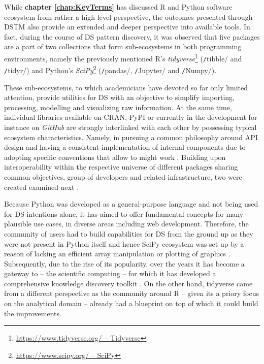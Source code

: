While \textbf{chapter \ref{chap:KeyTerms}} has discussed R and Python software ecosystem from rather a high-level perspective, the outcomes presented through \ac{DSTM} also provide an extended and deeper perspective into available tools.
In fact, during the course of \ac{DS} pattern discovery, it was observed that five packages are a part of two collections that form sub-ecosystems in both programming environments, namely the previously mentioned R's \emph{tidyverse}\footnote{\href{https://www.tidyverse.org}{https://www.tidyverse.org/ -- Tidyverse}} (\texttt/tibble/ and \texttt/tidyr/) and Python's \emph{SciPy}\footnote{\href{https://www.scipy.org/}{https://www.scipy.org/ -- SciPy}} (\texttt/pandas/, \texttt/Jupyter/ and \texttt/Numpy/).

These sub-ecosystems, to which academicians have devoted so far only limited attention, provide utilities for \ac{DS} with an objective to simplify importing, processing, modelling and visualizing raw information. 
At the same time, individual libraries available on \ac{CRAN}, \ac{PyPI} or currently in the development for instance on \emph{GitHub} are strongly interlinked with each other by possessing typical ecosystem characteristics.
Namely, in pursuing a common philosophy around \ac{API} design and having a consistent implementation of internal components due to adopting specific conventions that allow to  might work \parencite[785]{Bryan2017DataTent}.
Building upon interoperability within the respective universe of different packages sharing common objectives, group of developers and related infrastructure, two  were created examined next \parencite[785]{Bryan2017DataTent}. 

Because Python was developed as a general-purpose language and not being used for \ac{DS} intentions alone, it has aimed to offer fundamental concepts for many plausible use cases, in diverse areas including web development.
Therefore, the community of users had to build capabilities for \ac{DS} from the ground up as they were not present in Python itself and hence SciPy ecosystem was set up by a reason of lacking an efficient array manipulation or plotting of graphics \parencite{Millman2011PythonEngineers}.
Subsequently, due to the rise of its popularity, over the years it has become a gateway to  -- the scientific computing -- for which it has developed a comprehensive knowledge discovery toolkit \parencites{Perez2011Python:Computing}{Oliphant2007}. 
On the other hand, tidyverse came from a different perspective as the community around R -- given its a priory focus on the analytical domain -- already had a blueprint on top of which it could build the improvements.

